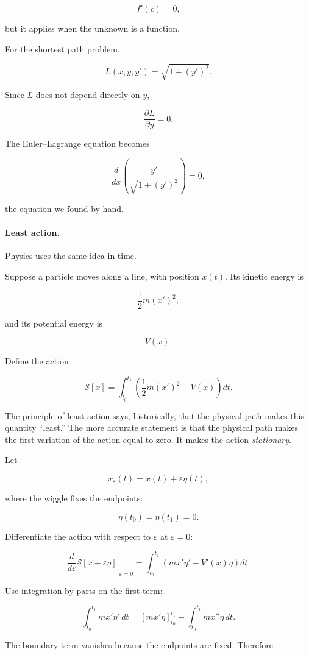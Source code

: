 \[
f'(c)=0,
\]

but it applies when the unknown is a function.

For the shortest path problem,

\[
L(x,y,y')=\sqrt{1+(y')^2}.
\]

Since \(L\) does not depend directly on \(y\),

\[
\frac{\partial L}{\partial y}=0.
\]

The Euler--Lagrange equation becomes

\[
\frac{d}{dx}
\left(
\frac{y'}{\sqrt{1+(y')^2}}
\right)
=0,
\]

the equation we found by hand.

\paragraph{Least action.}
Physics uses the same idea in time.

Suppose a particle moves along a line, with position \(x(t)\).  Its kinetic energy is

\[
\frac12m(x')^2,
\]

and its potential energy is

\[
V(x).
\]

Define the action

\[
\boxed{
\mathcal{S}[x]
=
\int_{t_0}^{t_1}
\left(
\frac12m(x')^2-V(x)
\right)
dt.
}
\]

The principle of least action says, historically, that the physical path makes this
quantity ``least.''  The more accurate statement is that the physical path makes the
first variation of the action equal to zero.  It makes the action \emph{stationary}.

Let

\[
x_\varepsilon(t)=x(t)+\varepsilon\eta(t),
\]

where the wiggle fixes the endpoints:

\[
\eta(t_0)=\eta(t_1)=0.
\]

Differentiate the action with respect to \(\varepsilon\) at \(\varepsilon=0\):

\[
\left.\frac{d}{d\varepsilon}\mathcal{S}[x+\varepsilon\eta]\right|_{\varepsilon=0}
=
\int_{t_0}^{t_1}
\left(
m x'\eta' - V'(x)\eta
\right)
dt.
\]

Use integration by parts on the first term:

\[
\int_{t_0}^{t_1}m x'\eta'\,dt
=
\left[mx'\eta\right]_{t_0}^{t_1}
-
\int_{t_0}^{t_1}m x''\eta\,dt.
\]

The boundary term vanishes because the endpoints are fixed.  Therefore

